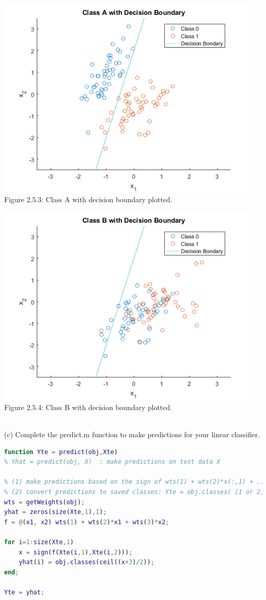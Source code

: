 \documentclass[]{report}   %
\begin{document}
\begin{center}
	\includegraphics[width=35em]{2_5_Figure_3.png}
	{Figure 2.5.3: Class A with decision boundary plotted.}
\end{center} 
\begin{center}
	\includegraphics[width=35em]{2_5_Figure_4.png}
	{Figure 2.5.4: Class B with decision boundary plotted.}
\end{center} 
~\\
{(c) Complete the predict.m function to make predictions for your linear classifier.}
\begin{lstlisting}[language=Matlab, caption=predict() Implementation]
function Yte = predict(obj,Xte)
% Yhat = predict(obj, X)  : make predictions on test data X

% (1) make predictions based on the sign of wts(1) + wts(2)*x(:,1) + ...
% (2) convert predictions to saved classes: Yte = obj.classes( [1 or 2] );
wts = getWeights(obj);
yhat = zeros(size(Xte,1),1);
f = @(x1, x2) wts(1) + wts(2)*x1 + wts(3)*x2;

for i=1:size(Xte,1)
    x = sign(f(Xte(i,1),Xte(i,2)));
    yhat(i) = obj.classes(ceil((x+3)/2));
end;

Yte = yhat;
\end{lstlisting}
\end{document}
